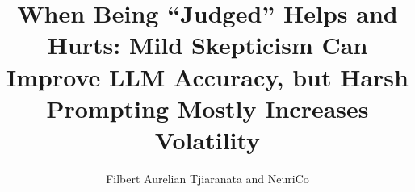 \documentclass{article}
\title{When Being ``Judged'' Helps and Hurts: Mild Skepticism Can Improve LLM Accuracy, but Harsh Prompting Mostly Increases Volatility}
\author{Filbert Aurelian Tjiaranata and NeuriCo}
\begin{document}
\maketitle

\begin{abstract}

\end{abstract}









\end{document}
